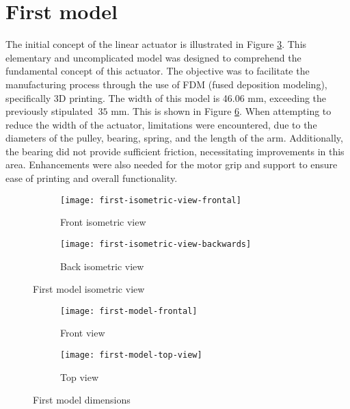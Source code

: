 \section{First model}

The initial concept of the linear actuator is illustrated in Figure \ref{fig:first-isometric-view}. This elementary and uncomplicated model was designed to comprehend the fundamental concept of this actuator. The objective was to facilitate the manufacturing process through the use of FDM (fused deposition modeling), specifically 3D printing. The width of this model is 46.06 mm, exceeding the previously stipulated $~35$ mm. This is shown in Figure \ref{fig:first-model-dimensions}. When attempting to reduce the width of the actuator, limitations were encountered, due to the diameters of the pulley, bearing, spring, and the length of the arm. Additionally, the bearing did not provide sufficient friction, necessitating improvements in this area. Enhancements were also needed for the motor grip and support to ensure ease of printing and overall functionality.

\begin{figure}[H]
    \centering
    \begin{subfigure}[b]{0.3\textwidth}
        \texttt{[image: first-isometric-view-frontal]}
        \caption{Front isometric view}
        \label{fig:first-front-isometric-view}
    \end{subfigure}
    \begin{subfigure}[b]{0.3\textwidth}
        \texttt{[image: first-isometric-view-backwards]}
        \caption{Back isometric view}
        \label{fig:first-back-isometric-view}
    \end{subfigure}
    \caption{First model isometric view}
    \label{fig:first-isometric-view}
\end{figure}

\begin{figure}[H]
    \centering
    \begin{subfigure}[b]{0.272\textwidth}
        \texttt{[image: first-model-frontal]}
        \caption{Front view}
        \label{fig:first-model-frontal}
    \end{subfigure}
    \begin{subfigure}[b]{0.628\textwidth}
        \texttt{[image: first-model-top-view]}
        \caption{Top view}
        \label{fig:first-model-top-view}
    \end{subfigure}
    \caption{First model dimensions}
    \label{fig:first-model-dimensions}
\end{figure}

